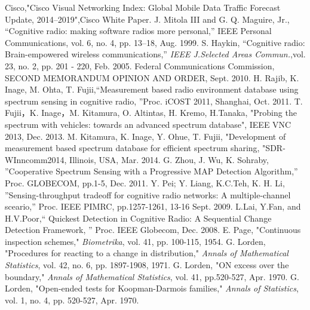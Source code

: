 \begin{thebibliography}{99}
Cisco,"Cisco Visual Networking Index: Global Mobile Data Traffic Forecast Update, 2014–2019",Cisco White Paper.
J. Mitola III and G. Q. Maguire, Jr., ``Cognitive radio: making software radios more personal,'' IEEE Personal Communications, vol. 6, no. 4, pp. 13–18, Aug. 1999.
 S. Haykin, ``Cognitive radio: Brain-empowered wireless communications,'' {\it IEEE J.Selected Areas Commun.},vol. 23, no. 2, pp. 201 - 220, Feb. 2005.
Federal Communications Commission, SECOND MEMORANDUM OPINION AND ORDER, Sept. 2010.
H. Rajib, K. Inage, M. Ohta, T. Fujii,“Measurement based radio environment database using spectrum sensing in cognitive radio, ”Proc. iCOST 2011, Shanghai, Oct. 2011.
T. Fujii，K. Inage，M. Kitamura, O. Altintas, H. Kremo, H.Tanaka, "Probing the spectrum with vehicles: towards an advanced spectrum database", IEEE VNC 2013, Dec. 2013.
M. Kitamura, K. Inage, Y. Ohue, T. Fujii, "Development of measurement based spectrum database for efficient spectrum sharing, "SDR-WInncomm2014, Illinois, USA, Mar. 2014.
G. Zhou, J. Wu, K. Sohraby, ”Cooperative Spectrum Sensing with a Progressive MAP Detection Algorithm,” Proc. GLOBECOM, pp.1-5, Dec. 2011.
Y. Pei; Y. Liang, K.C.Teh, K. H. Li, ”Sensing-throughput tradeoff for cognitive radio networks: A multiple-channel sceario,” Proc. IEEE PIMRC, pp.1257-1261, 13-16 Sept. 2009.
L.Lai, Y.Fan, and H.V.Poor,“ Quickest Detection in Cognitive Radio: A Sequential Change Detection Framework, ” Proc. IEEE Globecom, Dec. 2008.
E. Page, "Continuous inspection schemes," {\it Biometrika}, vol. 41, pp. 100-115, 1954.
G. Lorden, "Procedures for reacting to a change in distribution," {\it Annals of Mathematical Statistics}, vol. 42, no. 6, pp. 1897-1908, 1971.  
G. Lorden, "ON excess over the boundary," {\it Annals of Mathematical Statistics}, vol. 41, pp.520-527, Apr. 1970.
G. Lorden, "Open-ended tests for Koopman-Darmois families," {\it Annals of Statistics}, vol. 1, no. 4, pp. 520-527, Apr. 1970.
\end{thebibliography}
